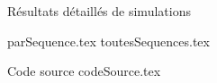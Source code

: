 \documentclass [memoire, letterpaper, oneside, 12pt]{thETS-utf8}
\begin{document}
\begin{chapter}{Résultats détaillés de simulations}
\label{Ann-Simulation}


{parSequence.tex}
{toutesSequences.tex}

\end{chapter}

\begin{chapter}{Code source}
{codeSource.tex}
\end{chapter}

%


\singlespacing
{} %
\doublespacing



\newpage
\singlespacing

\doublespacing
\end{document}
